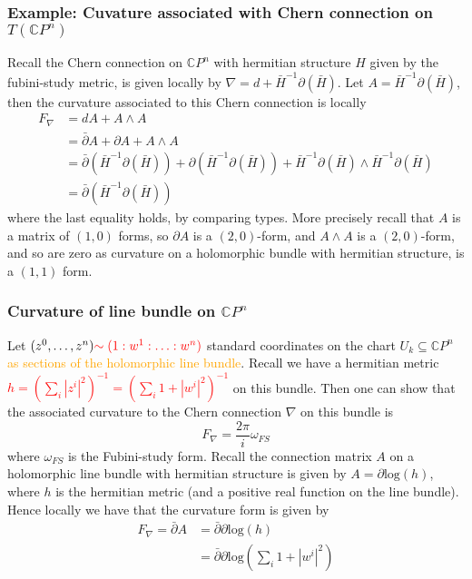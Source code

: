 \documentclass[a4paper]{article}
\theoremstyle{definition} \newtheorem*{definition}{Definition}
\theoremstyle{definition} \newtheorem*{definitions}{Definitions}
\theoremstyle{plain} \newtheorem{theorem}{Theorem}[section]
\theoremstyle{plain} \newtheorem{proposition}[theorem]{Proposition}
\theoremstyle{plain} \newtheorem{corollary}[theorem]{Corollary}
\theoremstyle{plain} \newtheorem{lemma}[theorem]{Lemma}
\theoremstyle{plain} \newtheorem{example}[theorem]{Example}
\newcommand{\checkCorrect}[1]{\textcolor{red}{#1}}
\newcommand{\understandBetter}[1]{\textcolor{orange}{#1}}
\newcommand{\complexnos}{\mathbb{C}}
\begin{document}
\subsubsection{Example: Cuvature associated with Chern connection on $T (\complexnos P^n)$}

Recall the Chern connection on $\complexnos P^n$ with hermitian structure $H$ given by the fubini-study metric, is given locally by $\nabla = d+\bar{H}^{-1}\partial(\bar{H})$. Let $A=\bar{H}^{-1}\partial(\bar{H})$, then the curvature associated to this Chern connection is locally 
\begin{align*}
    F_\nabla & = dA + A\wedge A \\
    & = \bar{\partial} A + \partial A + A\wedge A \\
    & = \bar{\partial}(\bar{H}^{-1}\partial(\bar{H})) + \partial(\bar{H}^{-1}\partial(\bar{H})) + \bar{H}^{-1}\partial(\bar{H}) \wedge \bar{H}^{-1}\partial(\bar{H}) \\
    & = \bar{\partial}(\bar{H}^{-1}\partial(\bar{H}))
\end{align*}
where the last equality holds, by comparing types. More precisely recall that $A$ is a matrix of $(1, 0)$ forms, so $\partial A$ is a $(2,0)$-form, and $A\wedge A$ is a $(2,0)$-form, and so are zero as curvature on a holomorphic bundle with hermitian structure, is a $(1,1)$ form.

\subsubsection{Curvature of line bundle on $\complexnos P^n$}
Let $(z^0, \ldots, z^n) \checkCorrect{\sim (1: w^1: \ldots : w^n)}$ standard coordinates on the chart $U_k\subseteq \complexnos P^n$ \understandBetter{as sections of the holomorphic line bundle}. Recall we have a hermitian metric \checkCorrect{$h=(\sum_i |z^i|^2)^{-1}=(\sum_i 1+|w^i|^2)^{-1}$} on this bundle. Then one can show that the associated curvature to the Chern connection $\nabla$ on this bundle is
$$F_\nabla = \frac{2\pi}{i} \omega_{FS} $$
where $\omega_{FS}$ is the Fubini-study form. Recall the connection matrix $A$ on a holomorphic line bundle with hermitian structure is given by $A = \partial \text{log}(h)$, where $h$ is the hermitian metric (and a positive real function on the line bundle). Hence locally we have that the curvature form is given by 
\begin{align*}
F_\nabla = \bar{\partial}A & =  \bar{\partial}\partial \text{log}(h) \\
& = \bar{\partial}\partial \text{log}(\sum_i 1+|w^i|^2)
\end{align*}
\end{document}
